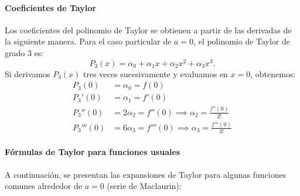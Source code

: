 \documentclass[12pt, a4paper]{article}
\theoremstyle{rioplatense}
\begin{document}
\paragraph{Coeficientes de Taylor}
Los coeficientes del polinomio de Taylor se obtienen a partir de las derivadas de la siguiente manera.
Para el caso particular de \( a = 0 \), el polinomio de Taylor de grado 3 es:
\[
P_3(x) = \alpha_0 + \alpha_1 x + \alpha_2 x^2 + \alpha_3 x^3.
\]
Si derivamos \( P_3(x) \) tres veces sucesivamente y evaluamos en \( x = 0 \), obtenemos:
\begin{align*}
P_3(0) &= \alpha_0 = f(0) \\
P_3'(0) &= \alpha_1 = f'(0) \\
P_3''(0) &= 2\alpha_2 = f''(0) \implies \alpha_2 = \frac{f''(0)}{2!} \\
P_3'''(0) &= 6\alpha_3 = f'''(0) \implies \alpha_3 = \frac{f'''(0)}{3!}
\end{align*}


\paragraph{Fórmulas de Taylor para funciones usuales}
A continuación, se presentan las expansiones de Taylor para algunas funciones comunes alrededor de \( a = 0 \) (serie de Maclaurin):
\end{document}
